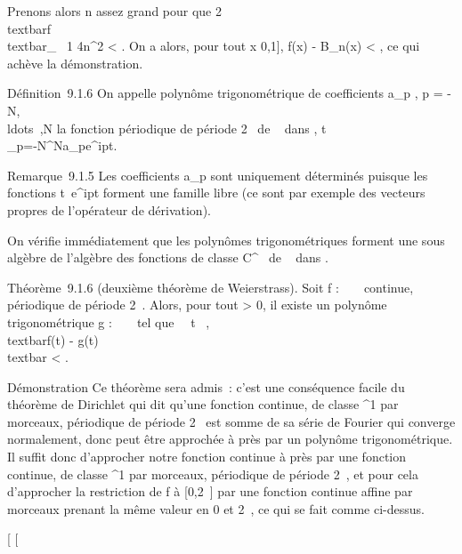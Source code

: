 \documentclass[]{article}
\begin{document}
Prenons alors n assez grand pour que
2\\textbar{}f\\textbar{}\_\infty~ 1
\over 4n\delta^2 \textless{} \epsilon
{} . On a alors, pour tout x \in {[}0,1{]},
\textbar{}f(x) - B\_n(x)\textbar{} \textless{} \epsilon, ce qui achève
la démonstration.

Définition~9.1.6 On appelle polynôme trigonométrique de coefficients
a\_p \in {}, p =
-N,\\ldots~,N la
fonction périodique de période 2\pi~ de ~ dans ,
t\mapsto~\\\sum
 \_p=-N^Na\_pe^ipt.

Remarque~9.1.5 Les coefficients a\_p sont uniquement déterminés
puisque les fonctions t\mapsto~e^ipt
forment une famille libre (ce sont par exemple des vecteurs propres de
l'opérateur de dérivation).

On vérifie immédiatement que les polynômes trigonométriques forment une
sous algèbre de l'algèbre des fonctions de classe C^\infty~ de ~
dans .

Théorème~9.1.6 (deuxième théorème de Weierstrass). Soit f : ~ \rightarrow~ 
continue, périodique de période 2\pi~. Alors, pour tout \epsilon \textgreater{} 0,
il existe un polynôme trigonométrique g : ~ \rightarrow~  tel que
\forall~~t \in {}~, \\textbar{}f(t) -
g(t)\\textbar{} \textless{} \epsilon.

Démonstration Ce théorème sera admis~: c'est une conséquence facile du
théorème de Dirichlet qui dit qu'une fonction continue, de classe
^1 par morceaux, périodique de période 2\pi~ est somme de sa
série de Fourier qui converge normalement, donc peut être approchée à 
\epsilon {} près par un polynôme trigonométrique. Il
suffit donc d'approcher notre fonction continue à  \epsilon
{} près par une fonction continue, de classe
^1 par morceaux, périodique de période 2\pi~, et pour cela
d'approcher la restriction de f à {[}0,2\pi~{]} par une fonction continue
affine par morceaux prenant la même valeur en 0 et 2\pi~, ce qui se fait
comme ci-dessus.

{[}
{[}
\end{document}
